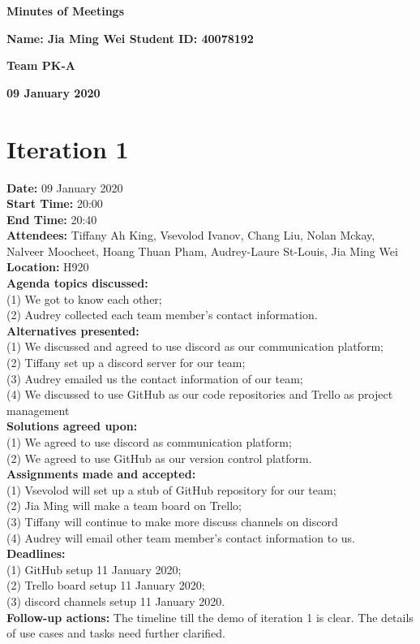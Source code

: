 \documentclass[12pt]{article}
\begin{document}
\vspace*{0.2in}
\centerline{\bf\Large Minutes of Meetings}

\vspace*{0.2in}
\centerline{\bf\Large Name: Jia Ming Wei   Student ID: 40078192}

\vspace*{0.2in}
\centerline{\bf\Large Team PK-A}

\vspace*{0.2in}
\centerline{\bf\Large 09 January 2020}

\newpage

\section{Iteration 1}

{\bf Date:} 09 January 2020\\
{\bf Start Time:} 20:00\\
{\bf End Time:}  20:40\\
{\bf Attendees:} Tiffany Ah King,
Vsevolod Ivanov,
Chang Liu,
Nolan Mckay,
Nalveer Moocheet,
Hoang Thuan Pham,
Audrey-Laure St-Louis,
Jia Ming Wei\\
{\bf Location:} H920 \\
{\bf Agenda topics discussed:} \\(1) We got to know each other; \\(2) Audrey collected each team member's contact information. \\
{\bf Alternatives presented:} \\(1) We discussed and agreed to use discord as our communication platform; \\(2) Tiffany set up a discord server for our team; \\(3) Audrey emailed us the contact information of our team; \\(4) We discussed to use GitHub as our code repositories and Trello as project management\\
{\bf Solutions agreed upon:} \\(1) We agreed to use discord as communication platform; \\(2) We agreed to use GitHub as our version control platform. \\
{\bf Assignments made and accepted:} \\(1) Vsevolod will set up a stub of GitHub repository for our team; \\(2) Jia Ming will make a team board on Trello; \\(3) Tiffany will continue to make more discuss channels on discord \\(4) Audrey will email other team member's contact information to us.\\
{\bf Deadlines:} \\(1) GitHub setup 11 January 2020; \\(2) Trello board setup 11 January 2020; \\(3) discord channels setup 11 January 2020. \\
{\bf Follow-up actions:} The timeline till the demo of iteration 1 is clear. The details of use cases and tasks need further clarified.\\
\end{document}
